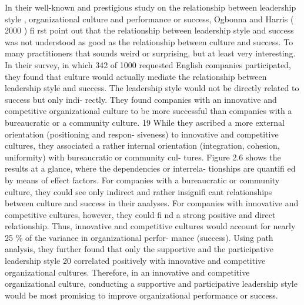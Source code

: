 In their well-known and prestigious study on the relationship between leadership style , organizational culture and performance or success, Ogbonna and Harris ( 2000 ) fi rst point out that the relationship between leadership style and success was not understood as good as the relationship between culture and success. To many practitioners that sounds weird or surprising, but at least very interesting. In their survey, in which 342 of 1000 requested English companies participated, they found that culture would actually mediate the relationship between leadership style and success. The leadership style would not be directly related to success but only indi- rectly. They found companies with an innovative and competitive organizational culture to be more successful than companies with a bureaucratic or a community culture. 19 While they ascribed a more external orientation (positioning and respon- siveness) to innovative and competitive cultures, they associated a rather internal orientation (integration, cohesion, uniformity) with bureaucratic or community cul- tures. Figure 2.6 shows the results at a glance, where the dependencies or interrela- tionships are quantifi ed by means of effect factors. For companies with a bureaucratic or community culture, they could see only indirect and rather insignifi cant relationships between culture and success in their analyses. For companies with innovative and competitive cultures, however, they could fi nd a strong positive and direct relationship. Thus, innovative and competitive cultures would account for nearly 25 \% of the variance in organizational perfor- mance (success). Using path analysis, they further found that only the supportive and the participative leadership style 20 correlated positively with innovative and competitive organizational cultures. Therefore, in an innovative and competitive organizational culture, conducting a supportive and participative leadership style would be most promising to improve organizational performance or success.



\newpage
